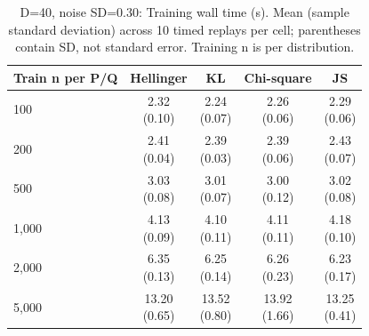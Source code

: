 \begin{table}[t]
\centering
\small
\setlength{\tabcolsep}{4pt}
\caption{D=40, noise SD=0.30: Training wall time (s). Mean (sample standard deviation) across 10 timed replays per cell; parentheses contain SD, not standard error. Training n is per distribution.}
\label{tab:sim-d-40-noise-sd-0-30-training-wall-time-s}
\begin{tabular}{lcccc}
\toprule
Train n per P/Q & Hellinger & KL & Chi-square & JS \\
\midrule
100 & \shortstack{2.32\\(0.10)} & \shortstack{2.24\\(0.07)} & \shortstack{2.26\\(0.06)} & \shortstack{2.29\\(0.06)} \\
200 & \shortstack{2.41\\(0.04)} & \shortstack{2.39\\(0.03)} & \shortstack{2.39\\(0.06)} & \shortstack{2.43\\(0.07)} \\
500 & \shortstack{3.03\\(0.08)} & \shortstack{3.01\\(0.07)} & \shortstack{3.00\\(0.12)} & \shortstack{3.02\\(0.08)} \\
1,000 & \shortstack{4.13\\(0.09)} & \shortstack{4.10\\(0.11)} & \shortstack{4.11\\(0.11)} & \shortstack{4.18\\(0.10)} \\
2,000 & \shortstack{6.35\\(0.13)} & \shortstack{6.25\\(0.14)} & \shortstack{6.26\\(0.23)} & \shortstack{6.23\\(0.17)} \\
5,000 & \shortstack{13.20\\(0.65)} & \shortstack{13.52\\(0.80)} & \shortstack{13.92\\(1.66)} & \shortstack{13.25\\(0.41)} \\
\bottomrule
\end{tabular}
\end{table}

